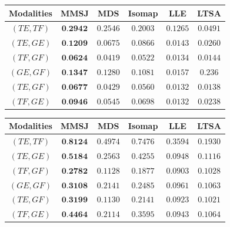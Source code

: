 \documentclass[times,twocolumn,final]{elsarticle}
\newenvironment{Table}
  {\par\bigskip\noindent\minipage{\columnwidth}\centering}
  {\endminipage\par\bigskip}
\begin{document}

\begin{Table}
\centering
{}
\label{table:wikiAcc}%
\begin{tabular}{|c||c|c|c|c|c|}
\hline
Modalities & MMSJ & MDS & Isomap & LLE & LTSA \\
\hline
$(TE, TF)$ & $\textbf{0.2942}$  & $0.2546$ & $0.2003$ & $0.1265$ & $0.0491$\\
\hline
$(TE, GE)$ & $\textbf{0.1209}$  & $0.0675$ & $0.0866$ & $0.0143$ & $0.0260$\\
\hline
$(TF, GF)$ & $\textbf{0.0624}$  & $0.0419$ & $0.0522$ & $0.0134$ & $0.0144$\\
\hline
$(GE, GF)$ & $\textbf{0.1347}$  & $0.1280$ & $0.1081$ & $0.0157$ & $0.236$\\
\hline
$(TE, GF)$ & $\textbf{0.0677}$  & $0.0429$ & $0.0560$ & $0.0132$ & $0.0138$\\
\hline
$(TF, GE)$ & $\textbf{0.0946}$  & $0.0545$ & $0.0698$ & $0.0132$ & $0.0238$\\
\hline
\end{tabular}
\end{Table}

\begin{Table}
\centering
{}
\label{table:wikiPower}
\begin{tabular}{|c||c|c|c|c|c|}
\hline
Modalities & MMSJ & MDS & Isomap & LLE & LTSA \\
\hline
$(TE, TF)$ & $\textbf{0.8124}$  & $0.4974$ & $0.7476$ & $0.3594$ & $0.1930$\\
\hline
$(TE, GE)$ & $\textbf{0.5184}$  & $0.2563$ & $0.4255$ & $0.0948$ & $0.1116$\\
\hline
$(TF, GF)$ & $\textbf{0.2782}$  & $0.1128$ & $0.1877$ & $0.0903$ & $0.1028$\\
\hline
$(GE, GF)$ & $\textbf{0.3108}$  & $0.2141$ & $0.2485$ & $0.0961$ & $0.1063$\\
\hline
$(TE, GF)$ & $\textbf{0.3199}$  & $0.1130$ & $0.2141$ & $0.0923$ & $0.1021$\\
\hline
$(TF, GE)$ & $\textbf{0.4464}$  & $0.2114$ & $0.3595$ & $0.0943$ & $0.1064$\\
\hline
\end{tabular}
\end{Table}
\end{document}
